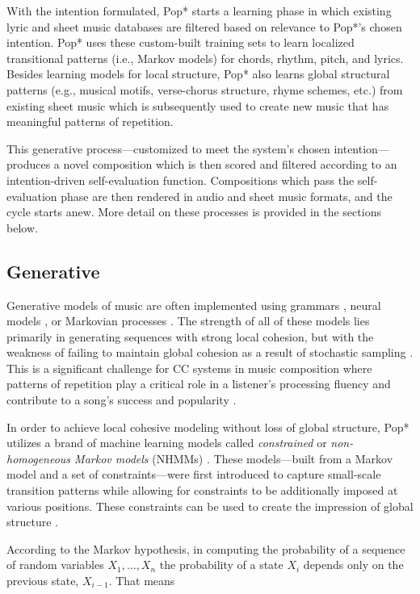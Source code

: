 \documentclass[phd,electronic,oneside,twosidetoc,letterpaper,chaptercenter,parttop,lof,lot]{byumsphd}
\begin{document}
With the intention formulated, Pop* starts a learning phase in which existing lyric and sheet music databases are filtered based on relevance to Pop*'s chosen intention. Pop* uses these custom-built training sets to learn localized transitional patterns (i.e., Markov models) for chords, rhythm, pitch, and lyrics. Besides learning models for local structure, Pop* also learns global structural patterns (e.g., musical motifs, verse-chorus structure, rhyme schemes, etc.) from existing sheet music which is subsequently used to create new music that has meaningful patterns of repetition.

This generative process---customized to meet the system's chosen intention---produces a novel composition which is then scored and filtered according to an intention-driven self-evaluation function. Compositions which pass the self-evaluation phase are then rendered in audio and sheet music formats, and the cycle starts anew. More detail on these processes is provided in the sections below.

\subsection{Generative}

Generative models of music are often implemented using grammars \citep{steedman1984generative}, neural models \citep{Jaques2016}, or Markovian processes \citep{conklin1995multiple}. The strength of all of these models lies primarily in generating sequences with strong local cohesion, but with the weakness of failing to maintain global cohesion as a result of stochastic sampling \citep{Jaques2016}. This is a significant challenge for CC systems in music composition where patterns of repetition play a critical role in a listener's processing fluency and contribute to a song's success and popularity \citep{Nunes2014}.

In order to achieve local cohesive modeling without loss of global structure, Pop* utilizes a brand of machine learning models called \textit{constrained} or \textit{non-homogeneous Markov models} (NHMMs) \citep{pachet2011finite}. These models---built from a Markov model and a set of constraints---were first introduced to capture small-scale transition patterns while allowing for constraints to be additionally imposed at various positions. These constraints can be used to create the impression of global structure \citep{barbieri2012markov}.

According to the Markov hypothesis, in computing the probability of a sequence of random variables $X_1,\dots,X_n$ the probability of a state $X_i$ depends only on the previous state, $X_{i-1}$. That means
\end{document}
